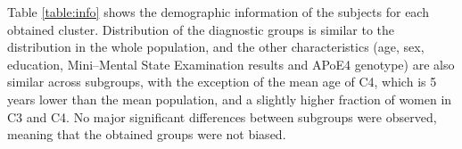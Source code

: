 \begin{table}[!htbp]
\centering
{}
\caption[Stability tests.]{Stability tests for the clustering, compared to random clustering and k-means clustering using Euclidian distance. Reported result is mean similarity.}
\label{table:jaccard}
\end{table}

Table \ref{table:info} shows the demographic information of the subjects for each obtained cluster. Distribution of the diagnostic groups is similar to the distribution in the whole population, and the other characteristics (age, sex, education, Mini–Mental State Examination results and APoE4 genotype) are also similar across subgroups, with the exception of the mean age of C4, which is 5 years lower than the mean population, and a slightly higher fraction of women in C3 and C4. No major significant differences between subgroups were observed, meaning that the obtained groups were not biased. \\

